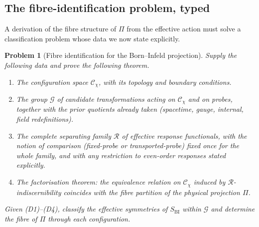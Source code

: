 \documentclass[11pt,a4paper]{article}
\newtheorem{problem}[theorem]{Problem}
\newcommand{\Proj}{\Pi}
\begin{document}
  \subsection{The fibre-identification problem, typed}
    \label{ssec:classification}

    A derivation of the fibre structure of $\Proj$ from the effective action must solve a
    classification problem whose data we now state explicitly.

    \begin{problem}[Fibre identification for the Born--Infeld projection]
      \label{prob:classification}
      Supply the following data and prove the following theorem.
      \begin{enumerate}
        \item[(D1)] The configuration space $\mathcal{C}_{\chi}$, with its topology and
        boundary conditions.
        \item[(D2)] The group $\mathcal{G}$ of candidate transformations acting on
        $\mathcal{C}_{\chi}$ and on probes, together with the prior quotients already taken
        (spacetime, gauge, internal, field redefinitions).
        \item[(D3)] The complete separating family $\mathcal{R}$ of effective response
        functionals, with the notion of comparison (fixed-probe or transported-probe) fixed
        once for the whole family, and with any restriction to even-order responses stated
        explicitly.
        \item[(D4)] The factorisation theorem: the equivalence relation on
        $\mathcal{C}_{\chi}$ induced by $\mathcal{R}$-indiscernibility coincides with the
        fibre partition of the physical projection $\Proj$.
      \end{enumerate}
      Given (D1)--(D4), classify the effective symmetries of $S_{\mathrm{BI}}$ within
      $\mathcal{G}$ and determine the fibre of $\Proj$ through each configuration.
    \end{problem}
\end{document}

